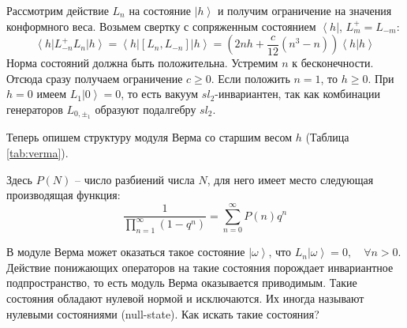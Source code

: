 \documentclass[a4paper,12pt]{article} \usepackage[utf8x]{inputenc} \usepackage[russian]{babel}
\theoremstyle{definition} \newtheorem{corollary}{Corollary}[theorem] \theoremstyle{definition}
\begin{document}
Рассмотрим действие $L_{n}$ на состояние $\left|h\right>$ и получим ограничение на значения
конформного веса. Возьмем свертку с сопряженным состоянием $\left<h\right|$, $L^{+}_{m}=L_{-m}$:
\begin{equation}
  \label{eq:308} \left<h\right|L^{+}_{-n}L_{n}\left|h\right>=\left<h\right|
[L_{n},L_{-n}]\left|h\right> = \left(2nh +\frac{c}{12}(n^{3}-n)\right) \left<h|h\right>
\end{equation} Норма состояний должна быть положительна. Устремим $n$ к бесконечности. Отсюда сразу
получаем ограничение $c\geq 0$. Если положить $n=1$, то $h\geq 0$. При $h=0$ имеем
$L_{1}\left|0\right>=0$, то есть вакуум $sl_{2}$-инвариантен, так как комбинации генераторов
$L_{0,\pm_{1}}$ образуют подалгебру $sl_{2}$.

Теперь опишем структуру модуля Верма со старшим весом $h$ (Таблица \ref{tab:verma}).

\begin{table}[tbh]
\label{tab:verma} \noindent {}
\caption{Структура модуля Верма}
\end{table}

Здесь $P(N)$ -- число разбиений числа $N$, для него имеет место следующая производящая функция:
\begin{equation}
  \label{eq:309} \frac{1}{\prod_{n=1}^{\infty} (1-q^{n})} = \sum_{n=0}^{\infty} P(n) q^{n}
\end{equation}

В модуле Верма может оказаться такое состояние $\left|\omega\right>$, что
$L_{n}\left|\omega\right>=0, \quad \forall n>0$. Действие понижающих операторов на такие состояния
порождает инвариантное подпространство, то есть модуль Верма оказывается приводимым. Такие состояния
обладают нулевой нормой и исключаются. Их иногда называют нулевыми состояниями (null-state). Как
искать такие состояния?
\end{document}
